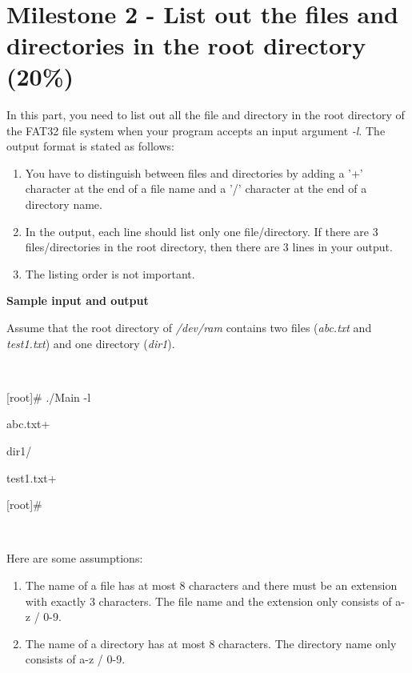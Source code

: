 \documentclass[a4paper,12pt]{article}
\begin{document}
~

\section*{Milestone 2 - List out the files and directories in the root directory (20\%)}

In this part, you need to list out all the file and directory in the root directory of the FAT32 file system when your program accepts an input argument \textit{-l}. The output format is stated as follows:

\begin{enumerate}
    \item You have to distinguish between files and directories by adding a '+' character at the end of a file name and a '/' character at the end of a directory name.
    \item In the output, each line should list only one file/directory. If there are 3 files/directories in the root directory, then there are 3 lines in your output.
    \item The listing order is not important.
\end{enumerate}

\noindent \textbf{Sample input and output}

Assume that the root directory of \textit{/dev/ram} contains two files (\textit{abc.txt} and \textit{test1.txt}) and one directory (\textit{dir1}).

~

\begin{tt}

[root]\# ./Main -l

abc.txt+

dir1/

test1.txt+

[root]\#

\end{tt}

~

Here are some assumptions:
\begin{enumerate}
    \item The name of a file has at most 8 characters
        and there must be an extension with exactly 3
        characters. The file name and the extension only consists of a-z / 0-9.
    \item The name of a directory has at most 8 characters.
        The directory name only consists of a-z / 0-9.
\end{enumerate}
\end{document}
